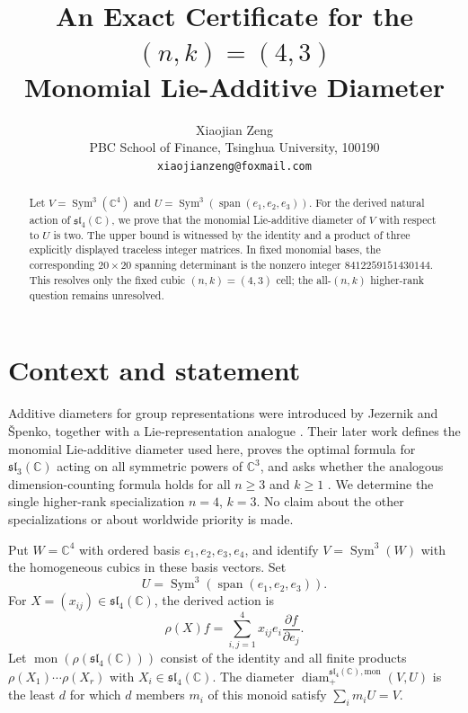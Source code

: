 \documentclass[11pt]{article}
\title{An Exact Certificate for the $(n,k)=(4,3)$\\
Monomial Lie-Additive Diameter}
\author{Xiaojian Zeng\\
\small PBC School of Finance, Tsinghua University, 100190\\
\small \texttt{xiaojianzeng@foxmail.com}}
\date{}
\newcommand{\C}{\mathbb{C}}
\newcommand{\Sym}{\operatorname{Sym}}
\newcommand{\mon}{\operatorname{mon}}
\newcommand{\diam}{\operatorname{diam}_{+}}
\newcommand{\slie}{\mathfrak{sl}}
\begin{document}
\maketitle

\begin{abstract}
Let $V=\Sym^3(\C^4)$ and
$U=\Sym^3(\operatorname{span}(e_1,e_2,e_3))$.  For the derived natural
action of $\slie_4(\C)$, we prove that the monomial Lie-additive diameter of
$V$ with respect to $U$ is two.  The upper bound is witnessed by the identity
and a product of three explicitly displayed traceless integer matrices.  In
fixed monomial bases, the corresponding $20\times20$ spanning determinant is
the nonzero integer $8412259151430144$.  This resolves only the fixed cubic
$(n,k)=(4,3)$ cell; the all-$(n,k)$ higher-rank question remains unresolved.
\end{abstract}

\section{Context and statement}

Additive diameters for group representations were introduced by Jezernik and
\v{S}penko, together with a Lie-representation analogue
\cite{JezernikSpenko2025}.  Their later work defines the monomial
Lie-additive diameter used here, proves the optimal formula for
$\slie_3(\C)$ acting on all symmetric powers of $\C^3$, and asks whether the
analogous dimension-counting formula holds for all $n\geq3$ and $k\geq1$
\cite[Section~8, Theorem~8.1 and Question~8.5]{JezernikSpenko2026}.
We determine the single higher-rank specialization $n=4$, $k=3$.  No claim
about the other specializations or about worldwide priority is made.

Put $W=\C^4$ with ordered basis $e_1,e_2,e_3,e_4$, and identify
$V=\Sym^3(W)$ with the homogeneous cubics in these basis vectors.  Set
\[
 U=\Sym^3(\operatorname{span}(e_1,e_2,e_3)).
\]
For $X=(x_{ij})\in\slie_4(\C)$, the derived action is
\begin{equation}\label{eq:action}
 \rho(X)f=\sum_{i,j=1}^4 x_{ij}e_i\frac{\partial f}{\partial e_j}.
\end{equation}
Let $\mon(\rho(\slie_4(\C)))$ consist of the identity and all finite products
$\rho(X_1)\cdots\rho(X_r)$ with $X_i\in\slie_4(\C)$.  The diameter
$\diam^{\slie_4(\C),\mathrm{mon}}(V,U)$ is the least $d$ for which $d$
members $m_i$ of this monoid satisfy $\sum_i m_iU=V$.
\end{document}
